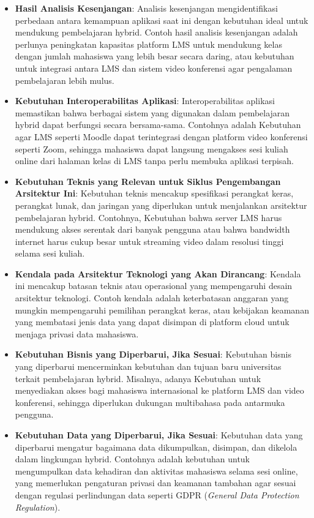 \begin{itemize}
	\item \textbf{Hasil Analisis Kesenjangan}: Analisis kesenjangan mengidentifikasi perbedaan antara kemampuan aplikasi saat ini dengan kebutuhan ideal untuk mendukung pembelajaran hybrid. Contoh hasil analisis kesenjangan adalah perlunya peningkatan kapasitas platform LMS untuk mendukung kelas dengan jumlah mahasiswa yang lebih besar secara daring, atau kebutuhan untuk integrasi antara LMS dan sistem video konferensi agar pengalaman pembelajaran lebih mulus.
	
	\item \textbf{Kebutuhan Interoperabilitas Aplikasi}: Interoperabilitas aplikasi memastikan bahwa berbagai sistem yang digunakan dalam pembelajaran hybrid dapat berfungsi secara bersama-sama. Contohnya adalah Kebutuhan agar LMS seperti Moodle dapat terintegrasi dengan platform video konferensi seperti Zoom, sehingga mahasiswa dapat langsung mengakses sesi kuliah online dari halaman kelas di LMS tanpa perlu membuka aplikasi terpisah.
	
	\item \textbf{Kebutuhan Teknis yang Relevan untuk Siklus Pengembangan Arsitektur Ini}: Kebutuhan teknis mencakup spesifikasi perangkat keras, perangkat lunak, dan jaringan yang diperlukan untuk menjalankan arsitektur pembelajaran hybrid. Contohnya, Kebutuhan bahwa server LMS harus mendukung akses serentak dari banyak pengguna atau bahwa bandwidth internet harus cukup besar untuk streaming video dalam resolusi tinggi selama sesi kuliah.
	
	\item \textbf{Kendala pada Arsitektur Teknologi yang Akan Dirancang}: Kendala ini mencakup batasan teknis atau operasional yang mempengaruhi desain arsitektur teknologi. Contoh kendala adalah keterbatasan anggaran yang mungkin mempengaruhi pemilihan perangkat keras, atau kebijakan keamanan yang membatasi jenis data yang dapat disimpan di platform cloud untuk menjaga privasi data mahasiswa.
	
	\item \textbf{Kebutuhan Bisnis yang Diperbarui, Jika Sesuai}: Kebutuhan bisnis yang diperbarui mencerminkan kebutuhan dan tujuan baru universitas terkait pembelajaran hybrid. Misalnya, adanya Kebutuhan untuk menyediakan akses bagi mahasiswa internasional ke platform LMS dan video konferensi, sehingga diperlukan dukungan multibahasa pada antarmuka pengguna.
	
	\item \textbf{Kebutuhan Data yang Diperbarui, Jika Sesuai}: Kebutuhan data yang diperbarui mengatur bagaimana data dikumpulkan, disimpan, dan dikelola dalam lingkungan hybrid. Contohnya adalah kebutuhan untuk mengumpulkan data kehadiran dan aktivitas mahasiswa selama sesi online, yang memerlukan pengaturan privasi dan keamanan tambahan agar sesuai dengan regulasi perlindungan data seperti GDPR (\textit{General Data Protection Regulation}).
\end{itemize}


